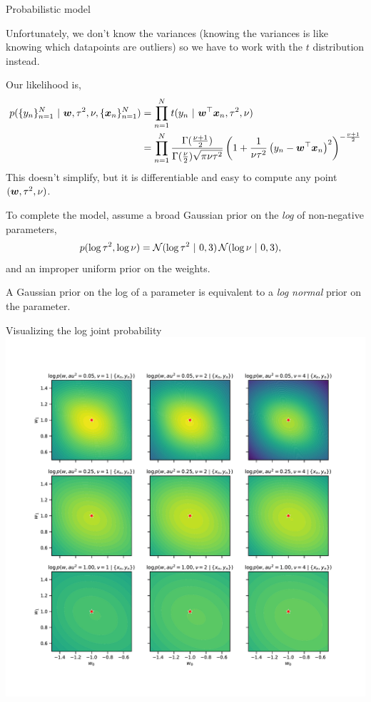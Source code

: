 \documentclass[aspectratio=169]{beamer}
\begin{document}
\begin{frame}{Probabilistic model}

Unfortunately, we don't know the variances (knowing the variances is like knowing which datapoints are outliers) so we have to work with the $t$ distribution instead.

Our likelihood is,
\begin{align}
    p(\{y_n\}_{n=1}^N ~\vert~ \boldsymbol{w}, \tau^2, \nu, \{\boldsymbol{x}_n\}_{n=1}^N) 
    &= \prod_{n=1}^N t(y_n ~\vert~ \boldsymbol{w}^\top \boldsymbol{x}_n, \tau^2, \nu) \\
    &= \prod_{n=1}^N \frac {\Gamma ({\frac {\nu +1}{2}})}{\Gamma ({\frac {\nu }{2}}){\sqrt {\pi \nu \tau^2}}} \left(1+{\frac {1}{\nu \tau^2}}\left(y_n-\boldsymbol{w}^\top \boldsymbol{x}_n \right)^{2}\right)^{-{\frac {\nu +1}{2}}}
\end{align}
This doesn't simplify, but it is differentiable and easy to compute any point $(\boldsymbol{w}, \tau^2, \nu)$.

To complete the model, assume a broad Gaussian prior on the \emph{log} of non-negative parameters,
\begin{align}
    p(\log \tau^2, \log \nu) &= \mathcal{N}(\log \tau^2 ~\vert~ 0, 3) \, \mathcal{N}(\log \nu ~\vert~ 0, 3),
\end{align}
and an improper uniform prior on the weights.

A Gaussian prior on the log of a parameter is equivalent to a \textit{log normal} prior on the parameter.

\end{frame}

\begin{frame}{Visualizing the log joint probability}
\centering
\includegraphics[width=.6\textwidth]{figures/lap3/robust_w_post.pdf}
\end{frame}
\end{document}
